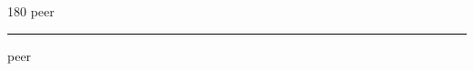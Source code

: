 
\begin{frame}
\begin{center}
\begin{turn}{180}
{\fontsize{2.5cm}{1em}\selectfont peer}
\end{turn}
\vspace{1em}\par  
\hrule
\vspace{1em}\par  
{\fontsize{2.5cm}{1em}\selectfont peer}
\end{center}
\end{frame}
